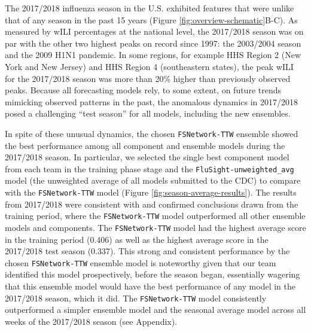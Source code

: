 \documentclass{article}\usepackage[]{graphicx}\usepackage[]{color}
\begin{document}
The 2017/2018 influenza season in the U.S. exhibited features that were unlike that of any season in the past 15 years (Figure \ref{fig:overview-schematic}B-C).
As measured by wILI percentages at the national level, the 2017/2018 season was on par with the other two highest peaks on record since 1997: the 2003/2004 season and the 2009 H1N1 pandemic.
In some regions, for example HHS Region 2 (New York and New Jersey) and HHS Region 4 (southeastern states), the peak wILI for the 2017/2018 season was more than 20\% higher than previously observed peaks.
Because all forecasting models rely, to some extent, on future trends mimicking observed patterns in the past, the anomalous dynamics in 2017/2018 posed a challenging ``test season'' for all models, including the new ensembles.

In spite of these unusual dynamics, the chosen {\tt FSNetwork-TTW} ensemble showed the best performance among all component and ensemble models during the 2017/2018 season.
In particular, we selected the single best component model from each team in the training phase stage and the {\tt FluSight-unweighted\_avg} model (the unweighted average of all models submitted to the CDC) to compare with the {\tt FSNetwork-TTW} model (Figure \ref{fig:season-average-results}).
The results from 2017/2018 were consistent with and confirmed conclusions drawn from the training period, where the {\tt FSNetwork-TTW} model outperformed all other ensemble models and components.
The {\tt FSNetwork-TTW} model had the highest average score in the training period 
(0.406) 
as well as the highest average score in the 2017/2018 test season 
(0.337).
This strong and consistent performance by the chosen {\tt FSNetwork-TTW} ensemble model is noteworthy given that our team identified this model prospectively, before the season began, essentially wagering that this ensemble model would have the best performance of any model in the 2017/2018 season, which it did.
The {\tt FSNetwork-TTW} model consistently outperformed a simpler ensemble model and the seasonal average model across all weeks of the 2017/2018 season (see Appendix).
\end{document}
